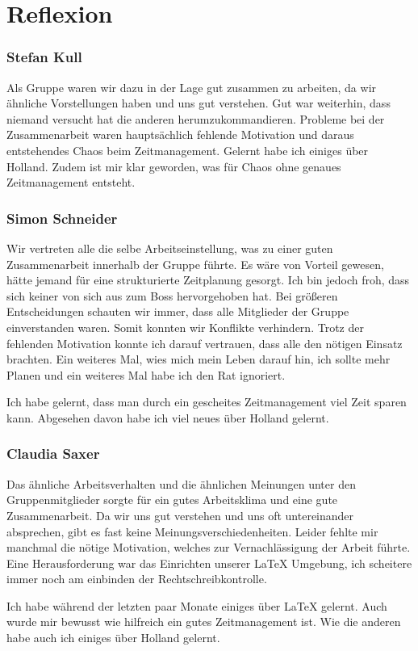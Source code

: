 \part{Reflexion}

\section{Stefan Kull}
Als Gruppe waren wir dazu in der Lage gut zusammen zu arbeiten, da wir 
ähnliche Vorstellungen haben und uns gut verstehen. Gut war weiterhin, dass niemand 
versucht hat die anderen herumzukommandieren. 
Probleme bei der Zusammenarbeit waren hauptsächlich fehlende Motivation und daraus 
entstehendes Chaos beim Zeitmanagement.
Gelernt habe ich einiges über Holland. Zudem ist mir klar geworden, was für Chaos ohne genaues
Zeitmanagement entsteht.

\section{Simon Schneider}
Wir vertreten alle die selbe Arbeitseinstellung, was zu einer guten Zusammenarbeit innerhalb
der Gruppe führte.
Es wäre von Vorteil gewesen, hätte jemand für eine strukturierte Zeitplanung gesorgt.
Ich bin jedoch froh, dass sich keiner von sich aus zum Boss hervorgehoben hat.
Bei größeren Entscheidungen schauten wir immer, dass alle Mitglieder der Gruppe einverstanden
waren. Somit konnten wir Konflikte verhindern. 
Trotz der fehlenden Motivation konnte ich darauf vertrauen, dass alle den nötigen Einsatz
brachten.
Ein weiteres Mal, wies mich mein Leben darauf hin, ich sollte mehr Planen und ein 
weiteres Mal habe ich den Rat ignoriert. 

Ich habe gelernt, dass man durch ein gescheites Zeitmanagement viel Zeit sparen kann.
Abgesehen davon habe ich viel neues über Holland gelernt. 

\section{Claudia Saxer}
Das ähnliche Arbeitsverhalten und die ähnlichen Meinungen unter den Gruppenmitglieder sorgte
für ein gutes Arbeitsklima und eine gute Zusammenarbeit. Da wir uns gut verstehen und uns 
oft untereinander absprechen, gibt es fast keine Meinungsverschiedenheiten. 
Leider fehlte mir manchmal die nötige Motivation, welches zur Vernachlässigung der Arbeit 
führte. 
Eine Herausforderung war das Einrichten unserer {LaTeX} Umgebung, ich scheitere immer noch
am einbinden der Rechtschreibkontrolle.

Ich habe während der letzten paar Monate einiges über {LaTeX} gelernt.
Auch wurde mir bewusst wie hilfreich ein gutes Zeitmanagement ist. 
Wie die anderen habe auch ich einiges über Holland gelernt.